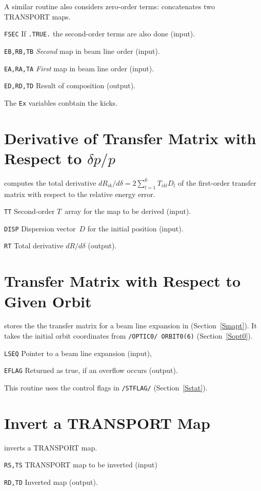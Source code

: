 A similar routine also considers zero-order terms:
concatenates two TRANSPORT maps.
\begin{mylist}
\item[\tt FSEC]
If {\tt .TRUE.} the second-order terms are also done (input).
\item[\tt EB,RB,TB]
{\em Second} map in beam line order (input).
\item[\tt EA,RA,TA]
{\em First} map in beam line order (input).
\item[\tt ED,RD,TD]
Result of composition (output).
\end{mylist}
The {\tt Ex} variables conbtain the kicks.

\section{Derivative of Transfer Matrix with Respect to $\delta p / p$}
\label{TMDERI}
computes the total derivative $dR_{ik}/d\delta = 2 \sum_{l=1}^6 T_{ikl} D_l$
of the first-order transfer matrix with respect to the relative energy
error.
\begin{mylist}
\item[\tt TT]
Second-order $T$~array for the map to be derived (input).
\item[\tt DISP]
Dispersion vector~$D$ for the initial position (input).
\item[\tt RT]
Total derivative $dR/d\delta$ (output).
\end{mylist}

\section{Transfer Matrix with Respect to Given Orbit}
\label{TMFRST}
stores the the transfer matrix for a beam line expansion
in  (Section~\ref{Smapt}).
It takes the initial orbit coordinates from {\tt /OPTIC0/ ORBIT0(6)}
(Section~\ref{Sopt0}).
\begin{mylist}
\item[\tt LSEQ]
Pointer to a beam line expansion (input),
\item[\tt EFLAG]
Returned as true, if an overflow occurs (output).
\end{mylist}
This routine uses the control flags in {\tt /STFLAG/}
(Section~\ref{Sstat}).

\section{Invert a TRANSPORT Map}
\label{TMINV}
inverts a TRANSPORT map.
\begin{mylist}
\item[\tt RS,TS]
TRANSPORT map to be inverted (input)
\item[\tt RD,TD]
Inverted map (output).
\end{mylist}

